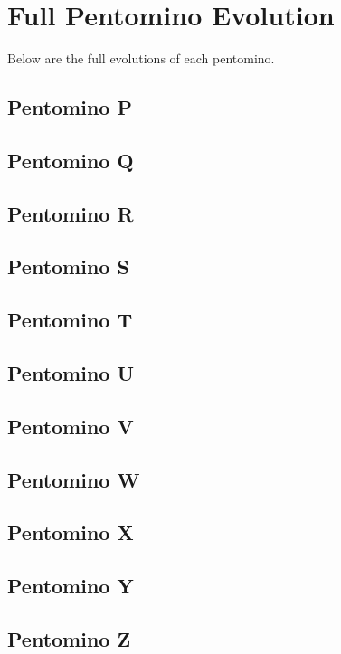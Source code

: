 
\section{Full Pentomino Evolution}
Below are the full evolutions of each pentomino.

\subsection{Pentomino P}
\subsection{Pentomino Q}
\subsection{Pentomino R}
\subsection{Pentomino S}
\subsection{Pentomino T}
\subsection{Pentomino U}
\subsection{Pentomino V}
\subsection{Pentomino W}
\subsection{Pentomino X}
\subsection{Pentomino Y}
\subsection{Pentomino Z}
